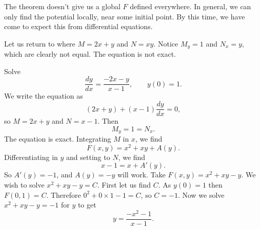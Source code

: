 The theorem doesn't give us a global $F$ defined everywhere.  In
general, we can only find the potential locally, near some initial point.
By this time, we have come to expect this from differential
equations.

Let us return to  where $M = 2x + y$ and $N = xy$.  
Notice 
$M_y = 1$ and  $N_x =
y$, which are clearly not equal.  The equation is not exact.

\begin{example}
Solve
\begin{equation*}
\frac{dy}{dx} = \frac{-2x-y}{x-1}, \qquad y(0) = 1.
\end{equation*}
We write the equation as
\begin{equation*}
(2x+y) + (x-1)\frac{dy}{dx} = 0 ,
\end{equation*}
so $M = 2x+y$ and $N = x-1$.  Then
\begin{equation*}
M_y = 1 = N_x .
\end{equation*}
The equation is exact.
Integrating $M$ in $x$, we find
\begin{equation*}
F(x,y) = x^2+xy + A(y) .
\end{equation*}
Differentiating in $y$ and setting to $N$, we find
\begin{equation*}
x-1 = x + A'(y) .
\end{equation*}
So $A'(y) = -1$, and $A(y) = -y$ will work.  Take $F(x,y) = x^2+xy-y$.  We
wish to solve $x^2+xy-y = C$.  First let us find $C$.  As $y(0)=1$ then
$F(0,1) = C$.  Therefore $0^2+0\times 1 - 1 = C$, so $C=-1$.  Now we solve
$x^2+xy-y = -1$ for $y$ to get
\begin{equation*}
y = \frac{-x^2-1}{x-1} .
\end{equation*}
\end{example}


